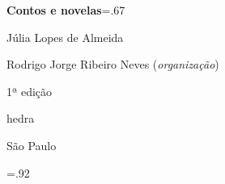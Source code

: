 




\begingroup\thispagestyle{empty}\vspace*{-.01\textheight}\parindent=0pt 
              \formular
              \Huge 
              \textbf{Contos e novelas}\baselineskip=.67\baselineskip 

              \vspace{15mm}
              
              \LARGE
              Júlia Lopes de Almeida
              
              \vspace{5cm}

              \newfontfamily{}
              {\selectfont\minion\small
              Rodrigo Jorge Ribeiro Neves (\textit{organização})}
              
              {\selectfont\minion\footnotesize
              1ª edição}
                    
              \vfill

              \newfontfamily{}
              {\fontsize{30}{40}\selectfont \timesnewroman hedra}
              
              \medskip

              {\selectfont\minion\small
              São Paulo \quad\the\year}
\endgroup
\pagebreak

\begingroup 

\footnotesize\parindent0pt\parskip5pt\thispagestyle{empty} 
\vspace*{.1\textheight}\mbox{} \vfill
\baselineskip=.92\baselineskip
\thispagestyle{empty}

